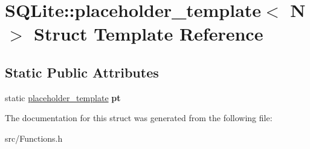 \hypertarget{struct_s_q_lite_1_1placeholder__template}{\section{S\-Q\-Lite\-:\-:placeholder\-\_\-template$<$ N $>$ Struct Template Reference}
\label{struct_s_q_lite_1_1placeholder__template}
}
\subsection*{Static Public Attributes}
\begin{DoxyCompactItemize}
\item 
\hypertarget{struct_s_q_lite_1_1placeholder__template_a60819a986742f08edbfc535124c006b1}{static \hyperlink{struct_s_q_lite_1_1placeholder__template}{placeholder\-\_\-template} {\bfseries pt}}\label{struct_s_q_lite_1_1placeholder__template_a60819a986742f08edbfc535124c006b1}

\end{DoxyCompactItemize}


The documentation for this struct was generated from the following file\-:\begin{DoxyCompactItemize}
\item 
src/Functions.\-h\end{DoxyCompactItemize}
